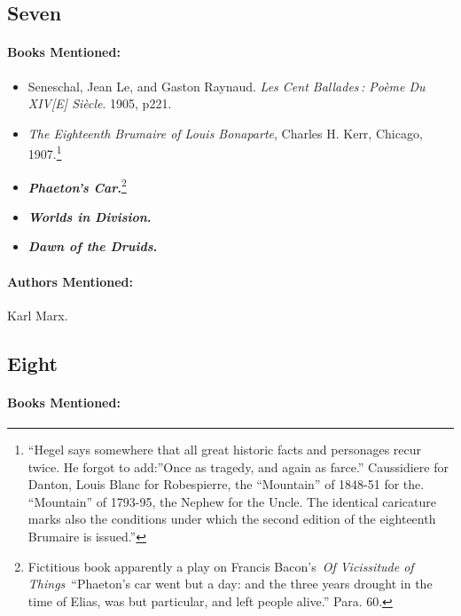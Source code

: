 \documentclass[12pt]{article}
\providecommand{\tightlist}{%
  \setlength{\itemsep}{0pt}\setlength{\parskip}{0pt}}
\begin{document}
\subsection{Seven}\label{seven-1}

\paragraph{Books Mentioned:}\label{books-mentioned-14}

\begin{itemize}
\tightlist
\item
  Seneschal, Jean Le, and Gaston Raynaud. \emph{Les Cent Ballades\,: Poème Du XIV{[}E{]} Siècle}. 1905, p221.
\item
  \emph{The Eighteenth Brumaire of Louis Bonaparte}, Charles H. Kerr, Chicago, 1907.\footnote{``Hegel says somewhere that all great historic facts and personages recur twice. He forgot to add:''Once as tragedy, and again as farce.'' Caussidiere for Danton, Louis Blanc for Robespierre, the ``Mountain'' of 1848-51 for the. ``Mountain'' of 1793-95, the Nephew for the Uncle. The identical caricature marks also the conditions under which the second edition of the eighteenth Brumaire is issued.''}
\item
  \textbf{\emph{Phaeton's Car}.}\footnote{Fictitious book apparently a play on Francis Bacon's~\emph{Of Vicissitude of Things}~``Phaeton's car went but a day: and the three years drought in the time of Elias, was but particular, and left people alive.'' Para. 60.}
\item
  \textbf{\emph{Worlds in Division}.}
\item
  \textbf{\emph{Dawn of the Druids}.}
\end{itemize}

\paragraph{Authors Mentioned:}\label{authors-mentioned-10}

Karl Marx.

\subsection{Eight}\label{eight}

\paragraph{Books Mentioned:}\label{books-mentioned-15}
\end{document}
